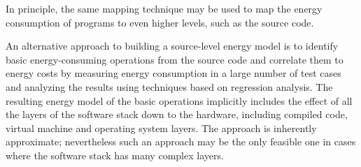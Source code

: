 In principle, the same mapping technique may be used to map the energy consumption
of programs to even higher levels, such as the source code. 


An alternative approach to building a source-level energy model is to identify
basic energy-consuming operations from the source code and
correlate them to energy costs by measuring energy consumption in
a large number of test cases and analyzing the results using techniques
based on regression analysis. The resulting energy model of the basic
operations implicitly includes the effect of all the layers of the software
stack down to the hardware, including compiled code, virtual machine and operating
system layers. The approach is inherently approximate;
nevertheless such an approach may be the only feasible one in cases where the software
stack has many complex layers. 


